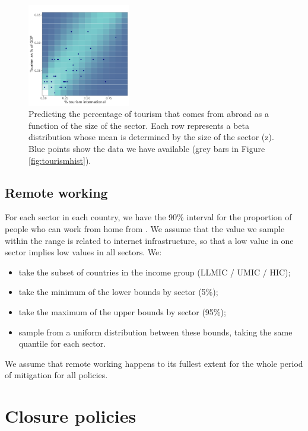 \documentclass[
]{article}
\providecommand{\tightlist}{%
  \setlength{\itemsep}{0pt}\setlength{\parskip}{0pt}}
\begin{document}
\begin{figure}
\centering
\includegraphics[width=0.4\textwidth,height=\textheight]{figures/sectortourism.png}
\caption{\label{fig:sectortourism} Predicting the percentage of tourism that comes from abroad as a function of the size of the sector. Each row represents a beta distribution whose mean is determined by the size of the sector (z). Blue points show the data we have available (grey bars in Figure \ref{fig:tourismhist}).}
\end{figure}

\newpage

\subsection{Remote working}\label{remote-working}

For each sector in each country, we have the 90\% interval for the proportion of people who can work from home from \citet{Gottlieb2021}. We assume that the value we sample within the range is related to internet infrastructure, so that a low value in one sector implies low values in all sectors. We:

\begin{itemize}
\tightlist
\item
  take the subset of countries in the income group (LLMIC / UMIC / HIC);
\item
  take the minimum of the lower bounds by sector (5\%);
\item
  take the maximum of the upper bounds by sector (95\%);
\item
  sample from a uniform distribution between these bounds, taking the same quantile for each sector.
\end{itemize}

We assume that remote working happens to its fullest extent for the whole period of mitigation for all policies.

\section{Closure policies}\label{closure-policies}
\end{document}
